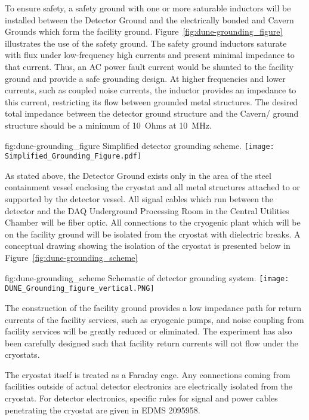 To ensure safety, a safety ground with one or more saturable inductors
will be installed between the Detector Ground and the electrically
bonded  and Cavern Grounds which form the facility ground.
Figure~\ref{fig:dune-grounding_figure} illustrates the use of the
safety ground. The safety ground inductors saturate with flux under
low-frequency high currents and present minimal impedance to that
current.  Thus, an AC power fault current would be shunted to the
facility ground and provide a safe grounding design. At higher
frequencies and lower currents, such as coupled noise currents, the
inductor provides an impedance to this current, restricting its flow
between grounded metal structures. The desired total impedance between
the detector ground structure and the Cavern/ ground
structure should be a minimum of \SI{10}{Ohms} at \SI{10}{MHz}.

\begin{dunefigure}{fig:dune-grounding_figure}
  {Simplified detector grounding scheme.}
  \texttt{[image: Simplified\_Grounding\_Figure.pdf]}
\end{dunefigure}

As stated above, the Detector Ground exists only in the area of the steel containment vessel enclosing the cryostat and all metal structures attached to or supported by the detector vessel.  All signal cables which run between the detector and the DAQ Underground Processing Room in the Central Utilities Chamber will be fiber optic.  All connections to the cryogenic plant which will be on the facility ground will be isolated from the cryostat with dielectric breaks.  A conceptual drawing showing the isolation of the cryostat is presented below in Figure~\ref{fig:dune-grounding_scheme}

\begin{dunefigure}{fig:dune-grounding_scheme}
  {Schematic of detector grounding system.}
  \texttt{[image: DUNE\_Grounding\_figure\_vertical.PNG]}
\end{dunefigure}

The construction of the facility ground provides a low impedance path for return currents of the facility services, such as cryogenic pumps, and noise coupling from facility services will be greatly reduced or eliminated.  The experiment has also been carefully designed such that facility return currents will not flow under the cryostats.

The cryostat itself is treated as a Faraday cage.  Any connections coming from facilities outside of actual detector electronics are electrically isolated from the cryostat.  For detector electronics, specific rules for signal and power cables penetrating the cryostat are given in EDMS 2095958.  






